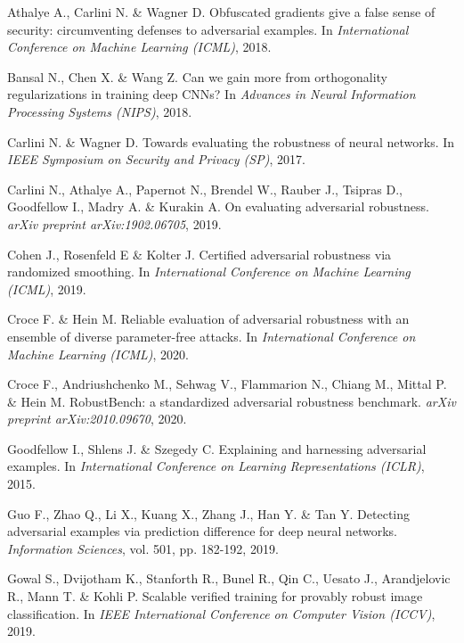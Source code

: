 \documentclass[preprint,review,12pt]{elsarticle}
\numberwithin{equation}{section}
\begin{document}
\begin{thebibliography}{99}

Athalye A., Carlini N. \& Wagner D.
Obfuscated gradients give a false sense of security: circumventing defenses to adversarial examples.
In \textit{International Conference on Machine Learning (ICML)}, 2018.

Bansal N., Chen X. \& Wang Z.
Can we gain more from orthogonality regularizations in training deep CNNs?
In \textit{Advances in Neural Information Processing Systems (NIPS)}, 2018.

Carlini N. \& Wagner D.
Towards evaluating the robustness of neural networks.
In \textit{IEEE Symposium on Security and Privacy (SP)}, 2017.

Carlini N., Athalye A., Papernot N., Brendel W., Rauber J., Tsipras D., Goodfellow I., Madry A. \& Kurakin A.
On evaluating adversarial robustness.
\textit{arXiv preprint arXiv:1902.06705}, 2019.

Cohen J., Rosenfeld E \& Kolter J.
Certified adversarial robustness via randomized smoothing.
In \textit{International Conference on Machine Learning (ICML)}, 2019.

Croce F. \& Hein M.
Reliable evaluation of adversarial robustness with an ensemble of diverse parameter-free attacks.
In \textit{International Conference on Machine Learning (ICML)}, 2020.

Croce F., Andriushchenko M., Sehwag V., Flammarion N., Chiang M., Mittal P. \& Hein M.
RobustBench: a standardized adversarial robustness benchmark.
\textit{arXiv preprint arXiv:2010.09670}, 2020.

Goodfellow I., Shlens J. \&  Szegedy C.
Explaining and harnessing adversarial examples.
In \textit{International Conference on Learning Representations (ICLR)}, 2015.

Guo F., Zhao Q., Li X., Kuang X., Zhang J., Han Y. \& Tan Y.
Detecting adversarial examples via prediction difference for deep neural networks.
\textit{Information Sciences}, vol. 501, pp. 182-192, 2019.

Gowal S., Dvijotham K., Stanforth R., Bunel R., Qin C., Uesato J., Arandjelovic R., Mann T. \& Kohli P.
Scalable verified training for provably robust image classification.
In \textit{IEEE International Conference on Computer Vision (ICCV)}, 2019.


\end{thebibliography}
\end{document}

